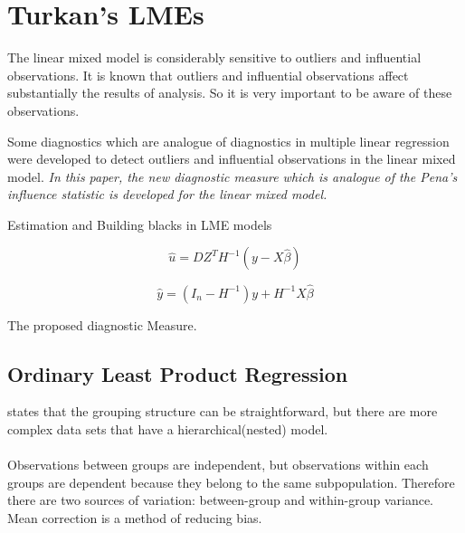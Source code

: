 \documentclass[12pt, a4paper]{report}
\begin{document}
\section{Turkan's LMEs}


The linear mixed model is considerably sensitive to outliers and influential observations. 
It is known that outliers and influential observations affect substantially the results of analysis. 
So it is very important to be aware of these observations. 

Some diagnostics which are analogue of diagnostics in multiple linear regression were developed to detect 
outliers and influential observations in the linear mixed model. 
\emph{
	In this paper, the new diagnostic measure which is analogue of the Pena's influence statistic is developed for 
	the linear mixed model.
}
\newpage


Estimation and Building blacks in LME models


\[ \hat{u} = DZ^{T}H^{-1}(y-X\hat{\beta}) \]

\[ \hat{y} = (I_n -  H^{-1})y + H^{-1}X\hat{\beta}\]


The proposed diagnostic Measure.


\subsection{Ordinary Least Product Regression}
\citet{ludbrook97} states that the grouping structure can be
straightforward, but there are more complex data sets that have a
hierarchical(nested) model.
\\
\\
Observations between groups are independent, but observations
within each groups are dependent because they belong to the same
subpopulation. Therefore there are two sources of variation:
between-group and within-group variance.
 \vspace{5 mm} \noindent Mean correction is a method of reducing
bias.
\end{document}
